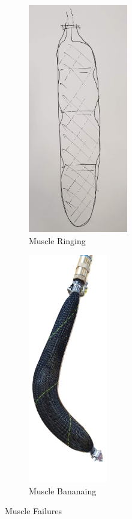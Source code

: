 \documentclass[11pt,a4paper]{article}
\begin{document}
\begin{figure}[!hbt]
    \centering
    \centering
    \begin{subfigure}[t]{0.45 \textwidth}
        \centering
        \includegraphics[height=10cm, trim={0cm 60cm 0cm 0cm},clip]{MuscleRinging.png}
        \caption{Muscle Ringing}
        \label{fig:incompatible_rings}
    \end{subfigure}
    \begin{subfigure}[t]{0.45 \textwidth}
        \centering
        \includegraphics[height=10cm, clip]{MuscleBananaing.png}
        \caption{Muscle Bananaing}
        \label{fig:incompatible_banana}
    \end{subfigure}
    \caption{Muscle Failures}
    \label{fig:incompatible_muscles}
\end{figure}
\end{document}
